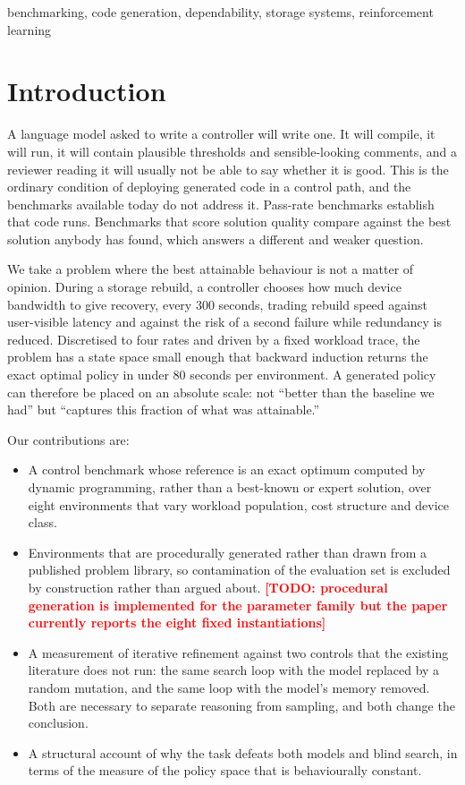 \documentclass[conference]{IEEEtran}
\newcommand{\TODO}[1]{\textcolor{red}{\textbf{[TODO: #1]}}}
\begin{document}
\begin{IEEEkeywords}
benchmarking, code generation, dependability, storage systems, reinforcement learning
\end{IEEEkeywords}

\section{Introduction}

A language model asked to write a controller will write one. It will compile, it will
run, it will contain plausible thresholds and sensible-looking comments, and a reviewer
reading it will usually not be able to say whether it is good. This is the ordinary
condition of deploying generated code in a control path, and the benchmarks available
today do not address it. Pass-rate benchmarks establish that code runs. Benchmarks that
score solution quality compare against the best solution anybody has found, which answers
a different and weaker question.

We take a problem where the best attainable behaviour is not a matter of opinion. During
a storage rebuild, a controller chooses how much device bandwidth to give recovery, every
$300$ seconds, trading rebuild speed against user-visible latency and against the risk of
a second failure while redundancy is reduced. Discretised to four rates and driven by a
fixed workload trace, the problem has a state space small enough that backward induction
returns the exact optimal policy in under $80$ seconds per environment. A generated policy
can therefore be placed on an absolute scale: not ``better than the baseline we had'' but
``captures this fraction of what was attainable.''

Our contributions are:

\begin{itemize}
\item A control benchmark whose reference is an exact optimum computed by dynamic
programming, rather than a best-known or expert solution, over eight environments that
vary workload population, cost structure and device class.
\item Environments that are procedurally generated rather than drawn from a published
problem library, so contamination of the evaluation set is excluded by construction
rather than argued about. \TODO{procedural generation is implemented for the parameter
family but the paper currently reports the eight fixed instantiations}
\item A measurement of iterative refinement against two controls that the existing
literature does not run: the same search loop with the model replaced by a random
mutation, and the same loop with the model's memory removed. Both are necessary to
separate reasoning from sampling, and both change the conclusion.
\item A structural account of why the task defeats both models and blind search, in terms
of the measure of the policy space that is behaviourally constant.
\end{itemize}
\end{document}
